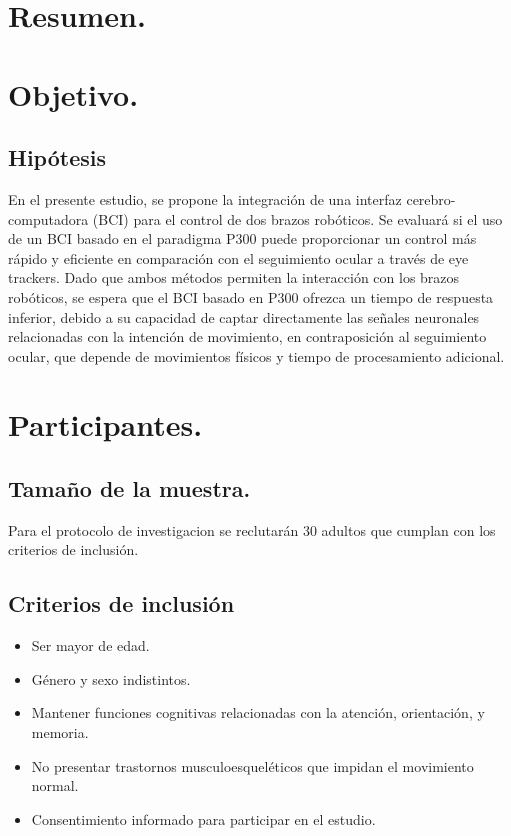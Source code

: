 \documentclass[12pt]{article}
\begin{document}
\section{Resumen.}
\section{Objetivo.}
\subsection{Hipótesis}
En el presente estudio, se propone la integración de una interfaz cerebro-computadora (BCI) para el control de dos brazos robóticos. Se evaluará si el uso de un BCI basado en el paradigma P300 puede proporcionar un control más rápido y eficiente en comparación con el seguimiento ocular a través de eye trackers. Dado que ambos métodos permiten la interacción con los brazos robóticos, se espera que el BCI basado en P300 ofrezca un tiempo de respuesta inferior, debido a su capacidad de captar directamente las señales neuronales relacionadas con la intención de movimiento, en contraposición al seguimiento ocular, que depende de movimientos físicos y tiempo de procesamiento adicional.

\section{Participantes.}
    \subsection{Tamaño de la muestra.}
        Para el protocolo de investigacion se reclutarán 30 adultos que cumplan con los criterios de inclusión.
    \subsection{Criterios de inclusión}
    \begin{itemize}
        \item Ser mayor de edad.
        \item Género y sexo indistintos.
        \item Mantener funciones cognitivas relacionadas con la atención, orientación, y memoria.
        \item No presentar trastornos musculoesqueléticos que impidan el movimiento normal.
        \item Consentimiento informado para participar en el estudio.
    \end{itemize}
        
\end{document}
